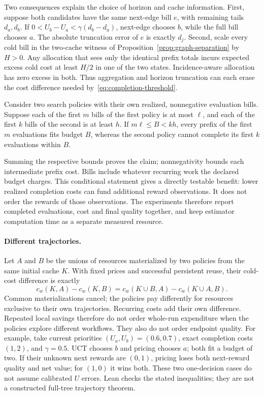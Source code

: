Two consequences explain the choice of horizon and cache information. First,
suppose both candidates have the same next-edge bill $e$, with remaining tails
$d_a,d_b$. If $0<U_b-U_a<\gamma(d_b-d_a)$, next-edge chooses $b$, while the full
bill chooses $a$. The absolute truncation error of $e$ is exactly $d_j$.
Second, scale every cold bill in the two-cache witness of
Proposition~\ref{prop:graph-separation} by $H>0$. Any allocation that sees only
the identical prefix totals incurs expected excess cold cost at least $H/2$
in one of the two states. Incidence-aware allocation has zero excess in both.
Thus aggregation and horizon truncation can each erase the cost difference
needed by~\eqref{eq:completion-threshold}.

\begin{proposition}
\label{prop:budget-coverage}
Consider two search policies with their own realized, nonnegative evaluation
bills. Suppose each of the first $m$ bills of the first policy is at most
$\ell$, and each of the first $k$ bills of the second is at least $h$.
If $m\ell\le B<kh$, every prefix of the first $m$ evaluations fits budget $B$,
whereas the second policy cannot complete its first $k$ evaluations within $B$.
\end{proposition}
Summing the respective bounds proves the claim; nonnegativity bounds each
intermediate prefix cost. Bills include whatever recurring work the declared
budget charges. This conditional statement gives a directly testable benefit:
lower realized completion costs can fund additional reward observations.
It does not order the rewards of those observations. The experiments therefore
report completed evaluations, cost and final quality together, and keep
estimator computation time as a separate measured resource.

\paragraph{Different trajectories.}
Let $A$ and $B$ be the unions of resources materialized by two policies from
the same initial cache $K$. With fixed prices and successful persistent reuse,
their cold-cost difference is exactly
\begin{equation}
 c_w(K,A)-c_w(K,B)
 =c_w(K\cup B,A)-c_w(K\cup A,B).
 \label{eq:exclusive-cost}
\end{equation}
Common materializations cancel; the policies pay differently for resources
exclusive to their own trajectories. Recurring costs add their own difference.
Repeated local savings therefore do not order whole-run expenditure when the
policies explore different workflows. They also do not order endpoint quality.
For example, take current priorities $(U_a,U_b)=(0.6,0.7)$, exact completion
costs $(1,2)$, and $\gamma=0.5$. UCT chooses $b$ and pricing chooses $a$;
both fit a budget of two. If their unknown next rewards are $(0,1)$, pricing
loses both next-reward quality and net value; for $(1,0)$ it wins both. These
two one-decision cases do not assume calibrated $U$ errors. Lean checks the
stated inequalities; they are not a constructed full-tree trajectory theorem.

